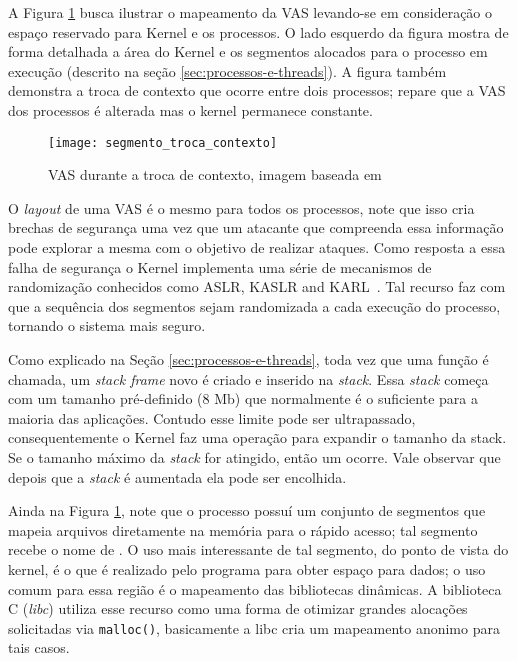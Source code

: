 A Figura \ref{fig:vas_contexto} busca ilustrar o mapeamento da VAS levando-se
em consideração o espaço reservado para Kernel e os processos. O lado esquerdo
da figura mostra de forma detalhada a área do Kernel e os segmentos alocados
para o processo em execução (descrito na seção \ref{sec:processos-e-threads}).
A figura também demonstra a troca de contexto que ocorre entre dois processos;
repare que a VAS dos processos é alterada mas o kernel permanece constante.

\begin{figure}[!h]
  \centering
  \texttt{[image: segmento\_troca\_contexto]}
  \caption{VAS durante a troca de contexto, imagem baseada em \citep{kernel_manages_memory}}
  \label{fig:vas_contexto}
\end{figure}

O \textit{layout} de uma VAS é o mesmo para todos os processos, note que isso
cria brechas de segurança uma vez que um atacante que compreenda essa informação
pode explorar a mesma com o objetivo de realizar ataques. Como resposta a essa
falha de segurança o Kernel implementa uma série de mecanismos de randomização
conhecidos como ASLR, KASLR and KARL~\citep{aslr, kaslr}. Tal recurso faz com
que a sequência dos segmentos sejam randomizada a cada execução do processo,
tornando o sistema mais seguro.

Como explicado na Seção \ref{sec:processos-e-threads}, toda vez que uma função
é chamada, um \textit{stack frame} novo é criado e inserido na \textit{stack}.
Essa \textit{stack} começa com um tamanho pré-definido (8 Mb) que normalmente é
o suficiente para a maioria das aplicações. Contudo esse limite pode ser
ultrapassado, consequentemente o Kernel faz uma operação para expandir o
tamanho da stack. Se o tamanho máximo da \textit{stack} for atingido, então um
 ocorre. Vale observar que depois que a \textit{stack} é
aumentada ela pode ser encolhida.

Ainda na Figura \ref{fig:vas_contexto}, note que o processo possuí um conjunto
de segmentos que mapeia arquivos diretamente na memória para o rápido acesso;
tal segmento recebe o nome de . O uso mais
interessante de tal segmento, do ponto de vista do kernel, é o
 que é realizado pelo programa para obter espaço
para dados; o uso comum para essa região é o mapeamento das bibliotecas
dinâmicas. A biblioteca C (\textit{libc}) utiliza esse recurso como uma forma
de otimizar grandes alocações solicitadas via \texttt{malloc()}, basicamente a
libc cria um mapeamento anonimo para tais casos.

